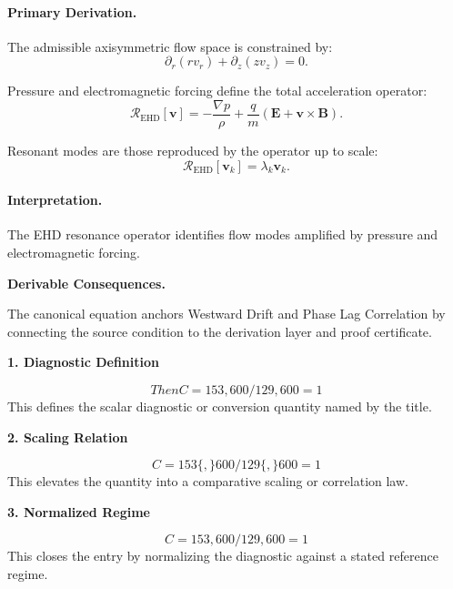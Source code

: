 \paragraph{Primary Derivation.}
The admissible axisymmetric flow space is constrained by:
\begin{equation}
\partial_r(rv_r)+\partial_z(zv_z)=0.
\end{equation}

Pressure and electromagnetic forcing define the total acceleration operator:
\begin{equation}
\mathcal{R}_{\mathrm{EHD}}[\mathbf{v}]
=
-\frac{\nabla p}{\rho}
+
\frac{q}{m}
(\mathbf{E}+\mathbf{v}\times\mathbf{B}).
\end{equation}

Resonant modes are those reproduced by the operator up to scale:
\begin{equation}
\boxed{
\mathcal{R}_{\mathrm{EHD}}[\mathbf{v}_k]
=
\lambda_k\mathbf{v}_k.
}
\end{equation}

\paragraph{Interpretation.}
The EHD resonance operator identifies flow modes amplified by pressure and electromagnetic forcing.

\par\vspace{0.35em}
\noindent\textbf{Derivable Consequences.}\quad
\begingroup
\footnotesize
\raggedright
The canonical equation anchors Westward Drift and Phase Lag Correlation by connecting the source condition to the derivation layer and proof certificate.
\par\endgroup

\noindent\textbf{1. Diagnostic Definition}\par
\[
Then C=153,600/129,600=1
\]
\noindent This defines the scalar diagnostic or conversion quantity named by the title.\par
\noindent\textbf{2. Scaling Relation}\par
\[
C = 153\{,\}600 / 129\{,\}600 = 1
\]
\noindent This elevates the quantity into a comparative scaling or correlation law.\par
\noindent\textbf{3. Normalized Regime}\par
\[
C=153,600/129,600=1
\]
\noindent This closes the entry by normalizing the diagnostic against a stated reference regime.\par

